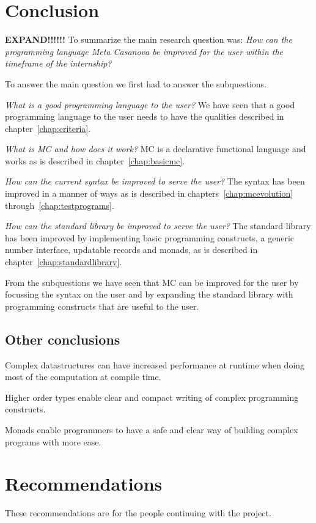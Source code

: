 \chapter{Conclusion}
\textbf{EXPAND!!!!!!}
To summarize the main research question was:
\emph{How can the programming language Meta Casanova be improved for the user within the timeframe of the internship?}

To answer the main question we first had to answer the subquestions.

\emph{What is a good programming language to the user?}
We have seen that a good programming language to the user needs to have the qualities described in chapter~\ref{chap:criteria}.

\emph{What is MC and how does it work?}
MC is a declarative functional language and works as is described in chapter~\ref{chap:basicmc}.

\emph{How can the current syntax be improved to serve the user?}
The syntax has been improved in a manner of ways as is described in chapters~\ref{chap:mcevolution} through~\ref{chap:testprograms}.

\emph{How can the standard library be improved to serve the user?}
The standard library has been improved by implementing basic programming constructs, a generic number interface, updatable records and monads, as is described in chapter~\ref{chap:standardlibrary}.

From the subquestions we have seen that MC can be improved for the user by focussing the syntax on the user and by expanding the standard library with programming constructs that are useful to the user.

\section{Other conclusions}
Complex datastructures can have increased performance at runtime when doing most of the computation at compile time.

Higher order types enable clear and compact writing of complex programming constructs.

Monads enable programmers to have a safe and clear way of building complex programs with more ease.



\chapter{Recommendations}\label{chap:resultsrecommendations}
These recommendations are for the people continuing with the project.

